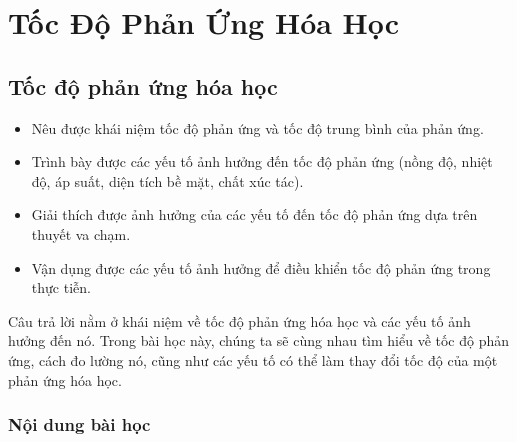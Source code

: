 \documentclass[Main.tex]{subfiles}
\begin{document}
\chapter{Tốc Độ Phản Ứng Hóa Học}
\section{Tốc độ phản ứng hóa học}
\begin{Muctieu}
    \begin{itemize}
        \item Nêu được khái niệm tốc độ phản ứng và tốc độ trung bình của phản ứng.
        \item Trình bày được các yếu tố ảnh hưởng đến tốc độ phản ứng (nồng độ, nhiệt độ, áp suất, diện tích bề mặt, chất xúc tác).
        \item Giải thích được ảnh hưởng của các yếu tố đến tốc độ phản ứng dựa trên thuyết va chạm.
        \item Vận dụng được các yếu tố ảnh hưởng để điều khiển tốc độ phản ứng trong thực tiễn.
    \end{itemize}
\end{Muctieu}
\begin{kd}
	Câu trả lời nằm ở khái niệm về tốc độ phản ứng hóa học và các yếu tố ảnh hưởng đến nó. Trong bài học này, chúng ta sẽ cùng nhau tìm hiểu về tốc độ phản ứng, cách đo lường nó, cũng như các yếu tố có thể làm thay đổi tốc độ của một phản ứng hóa học.
\end{kd}
\subsection{Nội dung bài học}
\end{document}

